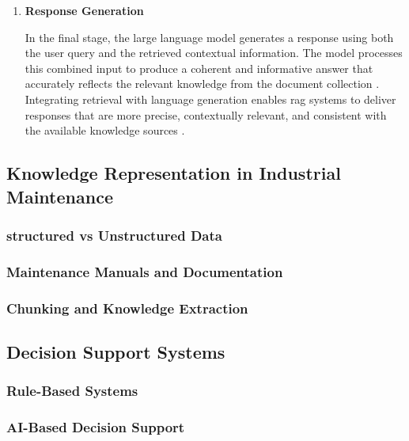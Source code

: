 \begin{enumerate}[label=\textbf{\arabic*.}]
    \item \textbf {Response Generation}
    
    In the final stage, the large language model generates a response using both the user query and the retrieved contextual information. The model processes this combined input to produce a coherent and informative answer that accurately reflects the relevant knowledge from the document collection \cite{sahin_llm_2024}. Integrating retrieval with language generation enables \acrfull{rag} systems to deliver responses that are more precise, contextually relevant, and consistent with the available knowledge sources \cite{chen_application_2025}.
\end{enumerate}

\subsection{Knowledge Representation in Industrial Maintenance \label{sec:Knowledge Representation in Industrial Maintenance}}

\subsubsection{structured vs Unstructured Data \label{sec:tructured vs Unstructured Data}}

\subsubsection{Maintenance Manuals and Documentation \label{sec:Maintenance Manuals and Documentation}}

\subsubsection{Chunking and Knowledge Extraction \label{sec:Chunking and Knowledge Extraction}}

\subsection{Decision Support Systems \label{sec:Decision Support Systems}}

\subsubsection{Rule-Based Systems \label{sec:Rule-Based Systems}}

\subsubsection{AI-Based Decision Support \label{sec:AI-Based Decision Support}}

